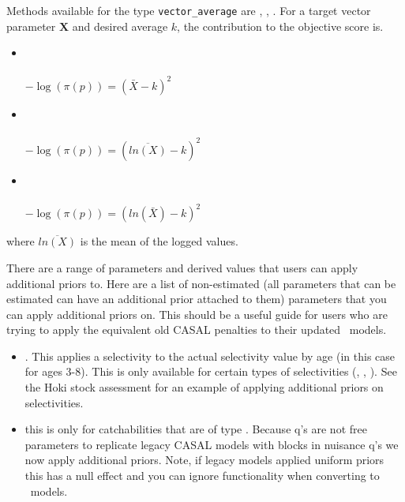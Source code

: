 Methods available for the type \texttt{vector\_average} are , , . For a target vector parameter $\textbf{X}$ and desired average $k$, the contribution to the objective score is.

\begin{itemize}
	\item {}\\\\
	$- \log \left(\pi \left(p \right) \right) = \left(\bar{X} - k\right)^2$

	\item {}\\\\
	$- \log \left(\pi \left(p \right) \right) = \left(\overline{ln\left(X\right)} - k\right)^2$

	\item {}\\\\
$- \log \left(\pi \left(p \right) \right) = \left(ln\left(\bar{X}\right) - k\right)^2$
\end{itemize}
where $\overline{ln\left(X\right)}$ is the mean of the logged values.


There are a range of parameters and derived values that users can apply additional priors to. Here are a list of non-estimated (all parameters that can be estimated can have an additional prior attached to them) parameters that you can apply additional priors on. This should be a useful guide for users who are trying to apply the equivalent old CASAL penalties to their updated \CNAME\ models.

\begin{itemize}
	\item {}. This applies a selectivity to the actual selectivity value by age (in this case for ages 3-8). This is only available for certain types of selectivities (, , ). See the Hoki stock assessment for an example of applying additional priors on selectivities.
	\item {}
	this is only for catchabilities that are of type . Because  q's are not free parameters to replicate legacy CASAL models with  blocks in nuisance q's we now apply additional priors. Note, if legacy models applied uniform priors this has a null effect and you can ignore functionality when converting to \CNAME\ models.
\end{itemize}

